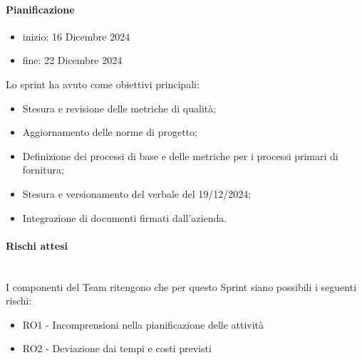 \documentclass{article}
\begin{document}
                \paragraph{Pianificazione}
                \begin{itemize}
                    \item inizio: 16 Dicembre 2024
                    \item fine: 22 Dicembre 2024
                \end{itemize}
                Lo sprint ha avuto come obiettivi principali:
                \begin{itemize}
                    \item Stesura e revisione delle metriche di qualità;
                    \item Aggiornamento delle norme di progetto;
                    \item Definizione dei processi di base e delle metriche per i processi primari di fornitura;
                    \item Stesura e versionamento del verbale del 19/12/2024;
                    \item Integrazione di documenti firmati dall'azienda.
                \end{itemize}


                \paragraph{Rischi attesi}\mbox{}\\
                I componenti del Team ritengono che per questo Sprint siano possibili i seguenti rischi:
                \begin{itemize}
                    \item RO1 - Incomprensioni nella pianificazione delle attività
                    \item RO2 - Deviazione dai tempi e costi previsti
                \end{itemize}

\end{document}
